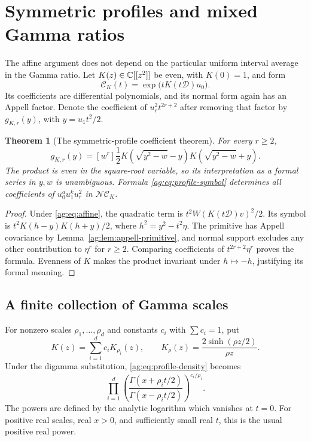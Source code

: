\documentclass[11pt,letterpaper]{article}
\numberwithin{equation}{section}
\newtheorem{theorem}{Theorem}[section]
\theoremstyle{definition}\newtheorem{definition}[theorem]{Definition}
\theoremstyle{remark}\newtheorem{remark}[theorem]{Remark}
\newcommand{\D}{\mathcal D}\newcommand{\NF}{\mathcal N}\newcommand{\Prim}{\mathcal T}
\begin{document}


\section{Symmetric profiles and mixed Gamma ratios}
\label{ag:sec:profiles}

The affine argument does not depend on the particular uniform interval
average in the Gamma ratio. Let $K(z)\in\mathbb C[[z^2]]$ be even, with
$K(0)=1$, and form
\begin{equation}\label{ag:eq:profile-density}
 \mathcal C_K(t)=\exp\bigl(tK(t\D)u_0\bigr).
\end{equation}
Its coefficients are differential polynomials, and its normal form again
has an Appell factor. Denote the coefficient of $u_r^2t^{2r+2}$ after
removing that factor by $g_{K,r}(y)$, with $y=u_1t^2/2$.

\begin{theorem}[The symmetric-profile coefficient theorem]
\label{ag:thm:profile}
For every $r\ge2$,
\begin{equation}\label{ag:eq:profile-symbol}
 \boxed{
 g_{K,r}(y)=[w^r]\frac12
 K\left(\sqrt{y^2-w}-y\right)
 K\left(\sqrt{y^2-w}+y\right).}
\end{equation}
The product is even in the square-root variable, so its interpretation
as a formal series in $y,w$ is unambiguous. Formula
\eqref{ag:eq:profile-symbol} determines all coefficients of
$u_0^a u_1^k u_r^2$ in $\NF\mathcal C_K$.
\end{theorem}
\begin{proof}
Under \eqref{ag:eq:affine}, the quadratic term is
$t^2W(K(t\D)v)^2/2$. Its symbol is
$t^2K(h-y)K(h+y)/2$, where $h^2=y^2-t^2\eta$.
The primitive has Appell covariance by
Lemma~\ref{ag:lem:appell-primitive}, and normal support excludes any
other contribution to $\eta^r$ for $r\ge2$. Comparing coefficients
of $t^{2r+2}\eta^r$ proves the formula. Evenness of $K$ makes the
product invariant under $h\mapsto-h$, justifying its formal meaning.
\end{proof}

\subsection{A finite collection of Gamma scales}
For nonzero scales $\rho_1,\ldots,\rho_d$ and constants $c_i$ with
$\sum c_i=1$, put
\[
 K(z)=\sum_{i=1}^dc_iK_{\rho_i}(z),\qquad
 K_\rho(z)=\frac{2\sinh(\rho z/2)}{\rho z}.
\]
Under the digamma substitution, \eqref{ag:eq:profile-density} becomes
\begin{equation}\label{ag:eq:mixed-Gamma}
 \prod_{i=1}^d
 \left(\frac{\Gamma(x+\rho_it/2)}{\Gamma(x-\rho_it/2)}\right)^{c_i/\rho_i}.
\end{equation}
The powers are defined by the analytic logarithm which vanishes at
$t=0$. For positive real scales, real $x>0$, and sufficiently small
real $t$, this is the usual positive real power.
\end{document}

